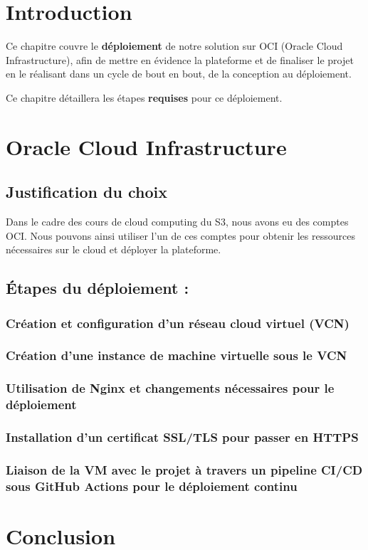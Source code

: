 \section{Introduction}
Ce chapitre couvre le \textbf{déploiement} de notre solution sur OCI (Oracle Cloud Infrastructure), afin de mettre en évidence la plateforme et de finaliser le projet en le réalisant dans un cycle de bout en bout, de la conception au déploiement.

Ce chapitre détaillera les étapes \textbf{requises} pour ce déploiement.
\newpage
\section{Oracle Cloud Infrastructure}
\subsection{Justification du choix}
Dans le cadre des cours de cloud computing du S3, nous avons eu des comptes OCI. Nous pouvons ainsi utiliser l'un de ces comptes pour obtenir les ressources nécessaires sur le cloud et déployer la plateforme.

\subsection{Étapes du déploiement :}
\subsubsection{Création et configuration d'un réseau cloud virtuel (VCN)}
\subsubsection{Création d'une instance de machine virtuelle sous le VCN}
\subsubsection{Utilisation de Nginx et changements nécessaires pour le déploiement}
\subsubsection{Installation d'un certificat SSL/TLS pour passer en HTTPS}
\subsubsection{Liaison de la VM avec le projet à travers un pipeline CI/CD sous GitHub Actions pour le déploiement continu}
\section{Conclusion}
